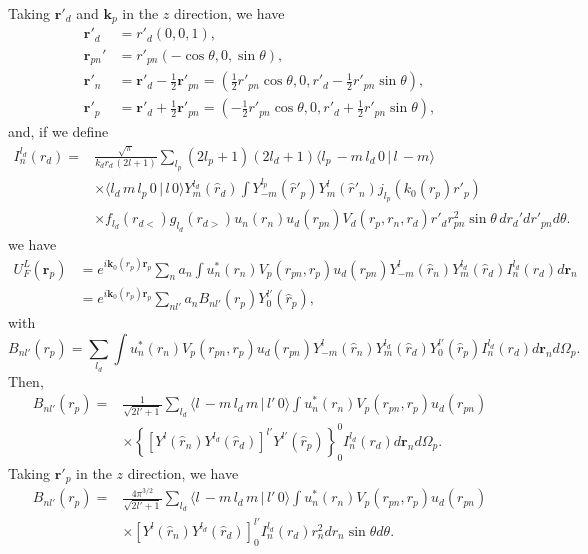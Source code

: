 \documentclass[a4paper,11pt]{article}
\begin{document}
Taking $\mathbf r'_d$ and $\mathbf k_p$ in the $z$ direction, we have
\begin{align}\label{eq43}
\nonumber\mathbf r'_d&=r'_d\left(0,0,1\right),\\
\nonumber\mathbf r_{pn}'&=r'_{pn}\left(-\cos\theta,0,\sin\theta\right),\\
\nonumber \mathbf r'_{n}&=\mathbf r'_d-\frac{1}{2}\mathbf r'_{pn}=\left(\frac{1}{2}r'_{pn}\cos\theta,0,r'_d-\frac{1}{2}r'_{pn}\sin\theta\right),\\
 \mathbf r'_{p}&=\mathbf r'_d+\frac{1}{2}\mathbf r'_{pn}=\left(-\frac{1}{2}r'_{pn}\cos\theta,0,r'_d+\frac{1}{2}r'_{pn}\sin\theta\right),
\end{align}
and, if we define
 \begin{align}\label{eq48}
\nonumber I^{l_d}_n(r_d)=&\frac{\sqrt{\pi}}{k_dr_d\,(2l+1)}\sum_{l_p}(2l_p+1)(2l_d+1)\langle l_p\,-m\,l_d\,0\,|\,l\,-m\rangle\\
\nonumber&\times\langle l_d\,m\,l_p\,0\,|\,l\,0\rangle Y^{l_d}_m(\hat r_d) \int  Y^{l_p}_{-m}(\hat r'_p)Y^{l}_{m}(\hat r'_n)j_{l_p}(k_0(r_p) r'_p)\\
&\times f_{l_d}(r_{d<})g_{l_d}(r_{d>})u_n(r_n)u_d(r_{pn}) V_{d}(r_{p},r_n,r_d) r'_dr_{pn}^2\sin\theta\, d r_d'dr'_{pn}d\theta.
 \end{align}
 we have
 \begin{align}\label{eq53}
 \nonumber U^L_F(\mathbf r_p)&=e^{i\mathbf k_0(r_p)\mathbf r_p}\sum_{n} a_n \int u_n^*(r_n)V_p(r_{pn},r_p)u_d(r_{pn})  Y^{l}_{-m}(\hat r_n)Y^{l_d}_m(\hat r_d) I^{l_d}_n(r_d)d\mathbf r_n\\
 &=e^{i\mathbf k_0(r_p)\mathbf r_p}\sum_{nl'} a_n B_{nl'}(r_p)Y_0^{l'}(\hat r_p),
 \end{align}
 with 
 \begin{equation}\label{eq54}
 B_{nl'}(r_p)=\sum_{l_d}\int u_n^*(r_n)V_p(r_{pn},r_p)u_d(r_{pn})  Y^{l}_{-m}(\hat r_n)Y^{l_d}_m(\hat r_d)Y^{l'}_0(\hat r_p) I^{l_d}_n(r_d)d\mathbf r_nd\Omega_p.
 \end{equation}
Then,
 \begin{align}\label{eq55}
 \nonumber B_{nl'}(r_p)=&\frac{1}{\sqrt{2l'+1}}\sum_{l_d}\langle l\,-m\,l_d\,m\,|\,l'\,0\rangle\int u_n^*(r_n)V_p(r_{pn},r_p)u_d(r_{pn})\\
 &\times  \left\{\left[Y^{l}(\hat r_n)Y^{l_d}(\hat r_d)\right]^{l'}Y^{l'}(\hat r_p)\right\}^0_0 I^{l_d}_n(r_d)d\mathbf r_nd\Omega_p.
 \end{align}
 Taking $\mathbf r'_p$ in the $z$ direction, we have
  \begin{align}\label{eq56}
  \nonumber B_{nl'}(r_p)=&\frac{4\pi^{3/2}}{\sqrt{2l'+1}}\sum_{l_d}\langle l\,-m\,l_d\,m\,|\,l'\,0\rangle\int u_n^*(r_n)V_p(r_{pn},r_p)u_d(r_{pn})\\
  &\times  \left[Y^{l}(\hat r_n)Y^{l_d}(\hat r_d)\right]^{l'}_0 I^{l_d}_n(r_d)r^2_n d r_n \sin\theta d\theta.
  \end{align}
\end{document}
